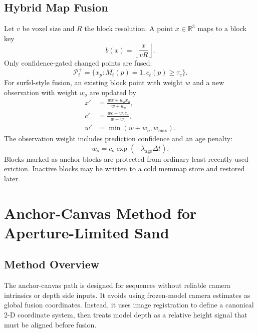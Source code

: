 \documentclass[conference]{IEEEtran}
\begin{document}
\subsection{Hybrid Map Fusion}
Let $v$ be voxel size and $R$ the block resolution. A point $x \in \mathbb{R}^3$ maps to a block key
\begin{equation}
b(x)=\left\lfloor \frac{x}{vR}\right\rfloor.
\end{equation}
Only confidence-gated changed points are fused:
\begin{equation}
\mathcal{P}_t^{+}=\{x_p: M_t(p)=1, c_t(p)\ge \tau_c\}.
\end{equation}
For surfel-style fusion, an existing block point with weight $w$ and a new observation with weight $w_o$ are updated by
\begin{equation}
\begin{aligned}
x'&=\frac{wx+w_o x_o}{w+w_o},\\
c'&=\frac{wc+w_o c_o}{w+w_o},\\
w'&=\min(w+w_o,w_{\max}).
\end{aligned}
\end{equation}
The observation weight includes prediction confidence and an age penalty:
\begin{equation}
w_o=c_o \exp(-\lambda_{\mathrm{age}}\Delta t).
\end{equation}
Blocks marked as anchor blocks are protected from ordinary least-recently-used eviction. Inactive blocks may be written to a cold memmap store and restored later.

\section{Anchor-Canvas Method for Aperture-Limited Sand}
\subsection{Method Overview}
The anchor-canvas path is designed for sequences without reliable camera intrinsics or depth side inputs. It avoids using frozen-model camera estimates as global fusion coordinates. Instead, it uses image registration to define a canonical 2-D coordinate system, then treats model depth as a relative height signal that must be aligned before fusion.
\end{document}
